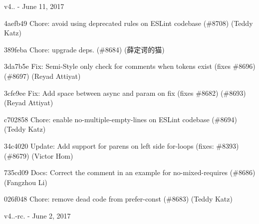 v4.. -\/ June 11, 2017


\begin{DoxyItemize}
\item 4aefb49 Chore\+: avoid using deprecated rules on ESLint codebase (\#8708) (Teddy Katz)
\item 389feba Chore\+: upgrade deps. (\#8684) (薛定谔的猫)
\item 3da7b5e Fix\+: Semi-\/\+Style only check for comments when tokens exist (fixes \#8696) (\#8697) (Reyad Attiyat)
\item 3cfe9ee Fix\+: Add space between async and param on fix (fixes \#8682) (\#8693) (Reyad Attiyat)
\item c702858 Chore\+: enable no-\/multiple-\/empty-\/lines on ESLint codebase (\#8694) (Teddy Katz)
\item 34c4020 Update\+: Add support for parens on left side for-\/loops (fixes\+: \#8393) (\#8679) (Victor Hom)
\item 735cd09 Docs\+: Correct the comment in an example for {\ttfamily no-\/mixed-\/requires} (\#8686) (Fangzhou Li)
\item 026f048 Chore\+: remove dead code from prefer-\/const (\#8683) (Teddy Katz)
\end{DoxyItemize}

v4..-\/rc. -\/ June 2, 2017


